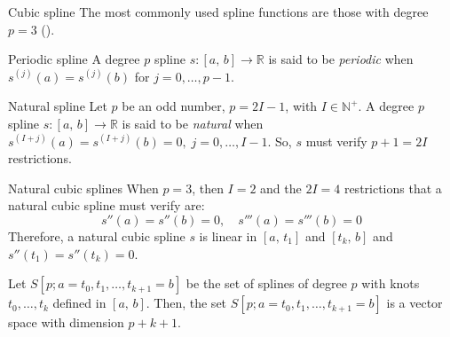 \begin{example}{Cubic spline}{}
    The most commonly used spline functions are those with degree $p=3$ ().
\end{example}

\begin{definition}{Periodic spline}{}
    A degree $p$ spline $s: [a,\,b] \to \mathds R$ is said to be \emph{periodic} when
    $s^{(j)}(a) = s^{(j)}(b)$ for $j=0,\ldots,p-1$.
\end{definition}

\begin{definition}{Natural spline}{}
    Let $p$ be an odd number, $p = 2I - 1$, with $I \in \mathbb{N}^+$. A degree $p$ spline
    $s: [a,\,b] \to \mathds R$ is said to be \emph{natural} when
    $s^{(I+j)}(a) = s^{(I+j)}(b) = 0,\;j=0,\ldots,I-1$.
    \tcblower
    So, $s$ must verify $p+1 = 2I$ restrictions.
\end{definition}

\begin{example}{Natural cubic splines}{}
    When $p=3$, then $I=2$ and the $2I=4$ restrictions that a natural
    cubic spline must verify are:
    \begin{equation*}
        s''(a) = s''(b) = 0,\quad s'''(a) = s'''(b) = 0
    \end{equation*}
    \tcblower
    Therefore, a natural cubic spline $s$ is linear in $[a,\,t_1]$ and $[t_k,\,b]$
    and $s''(t_1) = s''(t_k) = 0$.
\end{example}

\begin{prop}{}{}
    Let $S[p;a=t_0,t_1,\ldots,t_{k+1}=b]$ be the set of splines of
    degree $p$ with knots $t_0,\ldots,t_{k}$ defined in $[a,\,b]$.
    Then, the set $S[p;a=t_0,t_1,\ldots,t_{k+1}=b]$ is a vector space
    with dimension $p+k+1$.
\end{prop}

